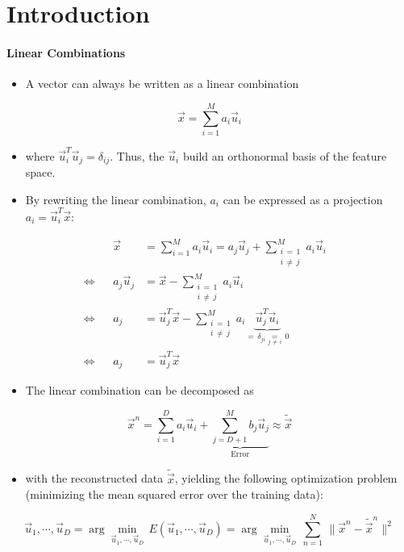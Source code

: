 	\section{Introduction}
		\paragraph{Linear Combinations}
			\begin{itemize}
				\item A vector can always be written as a linear combination
			\end{itemize}
			\begin{equation}
				\vec{x} = \sum_{i = 1}^{M} a_i \vec{u}_i
			\end{equation}
			\begin{itemize}
				\item[] where \( \vec{u}_i^T \vec{u}_j = \delta_{ij} \). Thus, the \( \vec{u}_i \) build an orthonormal basis of the feature space.
				\item By rewriting the linear combination, \( a_i \) can be expressed as a projection \( a_i = \vec{u}_i^T \vec{x} \):
			\end{itemize}
			\begin{align}
				     &  & \vec{x}       & = \sum_{i = 1}^{M} a_i \vec{u}_i = a_j \vec{u}_j + \sum_{\substack{i \,=\,  1   \\ i \,\neq\, j}}^{M} a_i \vec{u}_i & \\
				\iff &  & a_j \vec{u}_j & = \vec{x} - \sum_{\substack{i \,=\, 1                                           \\ i \,\neq\, j}}^{M} a_i \vec{u}_i & \\
				\iff &  & a_j           & = \vec{u}_j^T \vec{x} - \sum_{\substack{i \,=\, 1                               \\ i \,\neq\, j}}^{M} a_i \underbrace{\vec{u}_j^T \vec{u}_i}_{ =\, \delta_{ji} \underset{j \,\neq\, i}{=}\, 0 } & \\
				\iff &  & a_j           & = \vec{u}_j^T \vec{x}                                                         &
			\end{align}
			\begin{itemize}
				\item The linear combination can be decomposed as
			\end{itemize}
			\begin{equation}
				\vec{x}^n = \sum_{i = 1}^{D} a_i \vec{u}_i + \underbrace{\sum_{j = D + 1}^{M} b_j \vec{u}_j}_\textrm{Error} \approx \tilde{\vec{x}}
			\end{equation}
			\begin{itemize}
				\item[] with the reconstructed data \(\tilde{\vec{x}}\), yielding the following optimization problem (minimizing the mean squared error over the training data):
			\end{itemize}
			\begin{equation}
				\vec{u}_1, \cdots, \vec{u}_D = \arg\min\limits_{\vec{u}_1, \cdots, \vec{u}_D} \, E(\vec{u}_1, \cdots, \vec{u}_D) = \arg\min\limits_{\vec{u}_1, \cdots, \vec{u}_D} \, \sum_{n = 1}^{N} \, \lVert \vec{x}^n - \tilde{\vec{x}}^n \rVert^2
			\end{equation}

